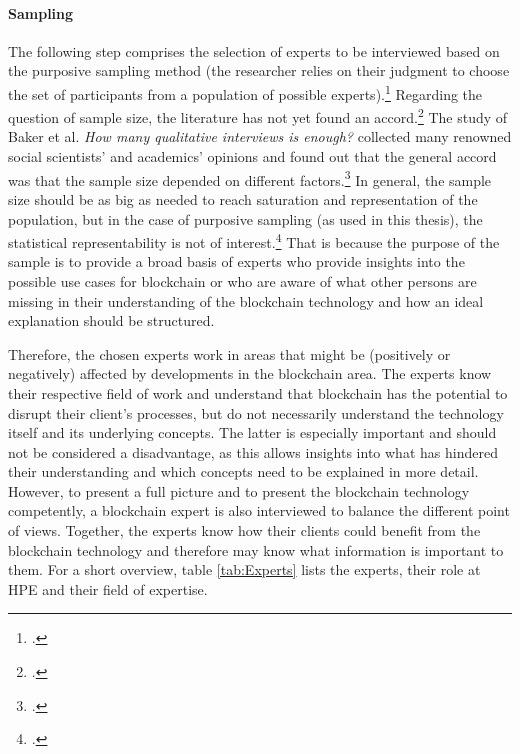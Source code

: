 \paragraph{Sampling} The following step comprises the selection of experts to be interviewed based on the purposive sampling method (the researcher relies on their judgment to choose the set of participants from a population of possible experts).\footcites[Cf.][p.137 et seqq]{Flickintroductionqualitativeresearch2009}[cf.][p.16]{EdwardsWhatqualitativeinterviewing2013}
Regarding the question of sample size, the literature has not yet found an accord.\footcites[Cf. in addition][p.1]{MorseDeterminingsamplesize2000}[cf.][p.134]{KrugerqualitativeInhaltsanalyseMethode2004} The study of Baker et al. \textit{How many qualitative interviews is enough?} collected many renowned social scientists' and academics' opinions and found out that the general accord was that the sample size depended on different factors.\footcites[Cf.][p.4 et seqq]{BakerHowmanyqualitative2012} In general, the sample size should be as big as needed to reach saturation and representation of the population, but in the case of purposive sampling (as used in this thesis), the statistical representability is not of interest.\footcite[Cf.][p.144]{MasonQualitativeresearching2002} That is because the purpose of the sample is to provide a broad basis of experts who provide insights into the possible use cases for blockchain or who are aware of what other persons are missing in their understanding of the blockchain technology and how an ideal explanation should be structured.

Therefore, the chosen experts work in areas that might be (positively or negatively) affected by developments in the blockchain area. The experts know their respective field of work and understand that blockchain has the potential to disrupt their client's processes, but do not necessarily understand the technology itself and its underlying concepts. The latter is especially important and should not be considered a disadvantage, as this allows insights into what has hindered their understanding and which concepts need to be explained in more detail. However, to present a full picture and to present the blockchain technology competently, a blockchain expert is also interviewed to balance the different point of views. Together, the experts know how their clients could benefit from the blockchain technology and therefore may know what information is important to them. For a short overview, table \ref{tab:Experts} lists the experts, their role at HPE and their field of expertise.

